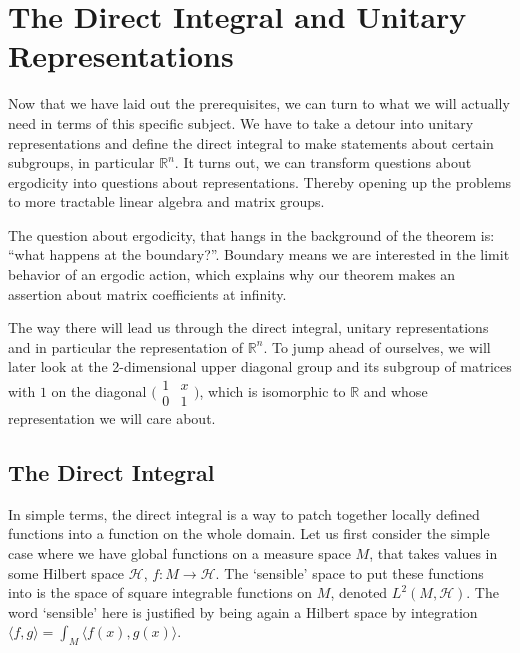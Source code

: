 \documentclass[
  12pt
]{article}
\theoremstyle{plain}
\newcommand{\bbr}{\ensuremath{\mathbb{R}}\xspace}
\newcommand{\ipmatrix}[1]{%
\ensuremath{\big(\begin{smallmatrix} #1 \end{smallmatrix}\big)}\xspace}
\begin{document}


\hypertarget{the-direct-integral-and-unitary-representations}{%
\section{The Direct Integral and Unitary Representations}\label{the-direct-integral-and-unitary-representations}}


  Now that we have laid out the prerequisites, we can turn to what we will actually need in terms of this specific subject.
  We have to take a detour into unitary
  representations and define the direct integral to make statements about
  certain subgroups, in particular $\bbr^n$.
  It turns out, we can transform questions about ergodicity into questions about representations.
  Thereby opening up the problems to more tractable linear algebra and matrix groups.

  The question about ergodicity, that hangs in the background of the theorem is:
  ``what happens at the boundary?''. Boundary means we are interested in the limit behavior of an ergodic action, which explains why our theorem makes an assertion about matrix coefficients at infinity.

  The way there will lead us through the direct integral, unitary
  representations and in particular the representation of $\mathbb{R}^n$. To
  jump ahead of ourselves, we will later look at the 2-dimensional upper
  diagonal group and its subgroup of matrices with $1$ on the diagonal
  \ipmatrix{1 & x \\ 0 & 1}, which is isomorphic to $\mathbb{R}$ and whose
  representation we will care about.

  \hypertarget{the-direct-integral}{%
  \subsection{The Direct Integral}\label{the-direct-integral}}

  In simple terms, the direct integral is a way to patch together locally
  defined functions into a function on the whole domain. Let us first
  consider the simple case where we have global functions on a measure
  space $M$, that takes values in some Hilbert space $\mathscr{H}$,
  $f:M \rightarrow \mathscr{H}$. The `sensible' space to put these
  functions into is the space of square integrable functions on $M$,
  denoted $L^2(M, \mathscr{H})$. The word `sensible' here is justified
  by being again a Hilbert space by integration
  $\langle f, g\rangle = \int_M\langle f(x), g(x)\rangle$.
\end{document}

